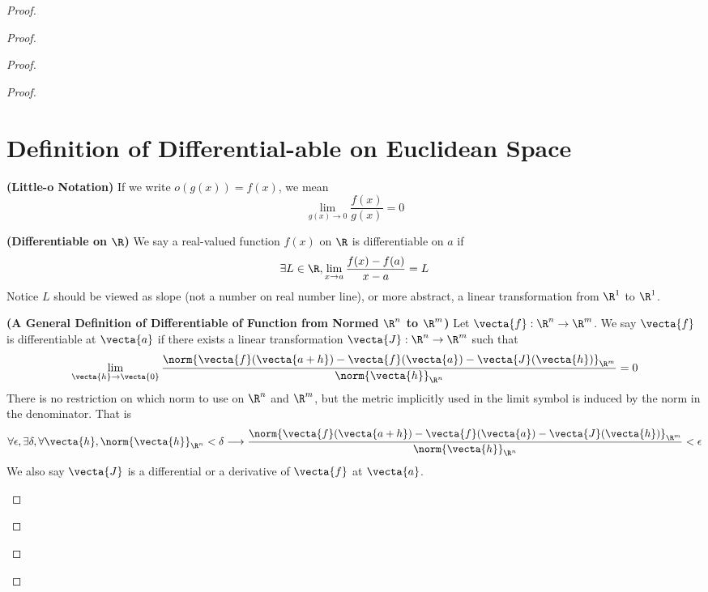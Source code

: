 \documentclass{report}
\begin{document}
\begin{proof}
\begin{proof}
\begin{proof}
\begin{proof}
\section{Definition of Differential-able on Euclidean Space} 
\begin{definition}
\label{8.2.1}
\textbf{(Little-o Notation)} If we write $o(g(x))=f(x)$, we mean
\begin{equation}
\lim_{g(x)\to 0}\frac{f(x)}{g(x)}=0
\end{equation}
\end{definition}
\begin{definition}
\label{8.2.2}
\textbf{(Differentiable on $\R$)} We say a real-valued function $f(x)$ on $\R$ is differentiable on $a$ if 
\begin{equation}
\exists L\in \R, \lim_{x \to a}\frac{f(x)-f(a)}{x-a}=L
\end{equation}
Notice $L$ should be viewed as slope (not a number on real number line), or more abstract, a linear transformation from $\R^1$ to  $\R^1$. 
\end{definition}
\begin{definition}
\label{8.2.3}
\textbf{(A General Definition of Differentiable of Function from Normed $\R^n$ to $\R^m$)} Let $\vecta{f}:\R^n\rightarrow \R^m$. We say $\vecta{f}$ is differentiable at $\vecta{a}$ if there exists a linear transformation $\vecta{J}:\R^n\rightarrow \R^m$ such that
\begin{equation}
\lim_{\vecta{h}\to \vecta{0}}\frac{\norm{\vecta{f}(\vecta{a+h})-\vecta{f}(\vecta{a})-\vecta{J}(\vecta{h})}_{\R^m}}{\norm{\vecta{h}}_{\R^n}}=0
\end{equation}
There is no restriction on which norm to use on $\R^n$ and $\R^m$, but the metric implicitly used in the limit symbol is induced by the norm in the denominator. That is
\begin{equation}
\forall \epsilon, \exists \delta, \forall \vecta{h},\norm{\vecta{h}}_{\R^n}<\delta \longrightarrow \frac{\norm{\vecta{f}(\vecta{a+h})-\vecta{f}(\vecta{a})-\vecta{J}(\vecta{h})}_{\R^m}}{\norm{\vecta{h}}_{\R^n}}<\epsilon
\end{equation}
We also say $\vecta{J}$ is a differential or a derivative of $\vecta{f}$ at $\vecta{a}$.
\end{definition}


\end{proof}
\end{proof}
\end{proof}
\end{proof}
\end{document}
